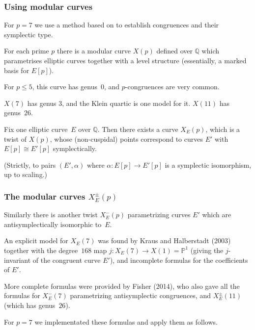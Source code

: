 \documentclass[handout]{beamer}
\newcommand{\Q}{\mathbb Q}
\newcommand{\PP}{\mathbb P}
\newcommand{\high}[1]{\emph{\color{blue}{#1}}}
\begin{document}
\begin{frame}\frametitle{Using modular curves}

  For $p=7$ we use a method based on \high{modular curves} to
  establish congruences and their symplectic type.    \pause

 For each prime $p$ there is a modular curve $X(p)$ defined over $\Q$
 which parametrises elliptic curves together with a level structure
 (essentially, a marked basis for $E[p]$).    \pause

 For $p\le5$, this curve has genus~$0$, and $p$-congruences are very
 common.

 $X(7)$ has genus $3$, and the Klein quartic is one model for it.
 $X(11)$ has genus~$26$.

    \pause
  \medskip
  Fix one elliptic curve~$E$ over $\Q$.  Then there exists a curve
  $X_E(p)$, which is a twist of $X(p)$, whose (non-cuspidal) points
  correspond to curves $E'$ with $E[p]\cong E'[p]$ symplectically.

  {\small(Strictly, to pairs $(E',\alpha)$ where $\alpha:E[p]\to E'[p]$ is a
  symplectic isomorphism, up to scaling.)}
\end{frame}

\begin{frame}\frametitle{The modular curves $X_E^{\pm}(p)$}
Similarly there is another twist $X_E^-(p)$ parametrizing curves $E'$
which are antisymplectically isomorphic to~$E$.
    \pause
  \medskip

An explicit model for $X_E(7)$ was found by Kraus and Halberstadt
(2003) together with the degree~$168$ map $j:X_E(7)\to X(1)=\PP^1$
(giving the $j$-invariant of the congruent curve $E'$), and incomplete
formulas for the coefficients of $E'$.

    \pause
  \medskip
More complete formulas were provided by Fisher (2014), who also gave
all the formulas for $X_E^-(7)$ parametrizing antisymplectic
congruences, and $X_E^{\pm}(11)$ (which has genus~$26$).

    \pause
  \medskip
For $p=7$ we implementated these formulas and apply them as follows.
\end{frame}
\end{document}
